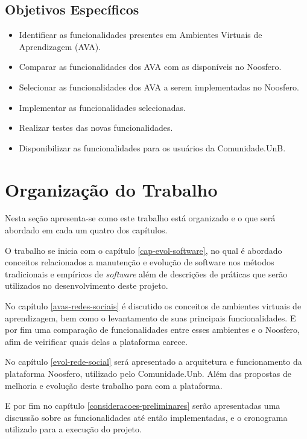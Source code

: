 \subsection{Objetivos Específicos}

\begin{itemize}
\item Identificar as funcionalidades presentes em Ambientes Virtuais de Aprendizagem (AVA).
\item Comparar as funcionalidades dos AVA com as disponíveis no Noosfero.
\item Selecionar as funcionalidades dos AVA a serem implementadas no Noosfero.
\item Implementar as funcionalidades selecionadas.
\item Realizar testes das novas funcionalidades.
\item Disponibilizar as funcionalidades para os usuários da Comunidade.UnB.
\end{itemize}

\section{Organização do Trabalho}

Nesta seção apresenta-se como este trabalho está organizado e o que será abordado em cada um quatro dos capítulos.

O trabalho se inicia com o capítulo \ref{cap-evol-software}, no qual é abordado conceitos relacionados a manutenção e evolução de software nos métodos tradicionais e empíricos de \textit{software} além de descrições de práticas que serão utilizados no desenvolvimento deste projeto.

No capítulo \ref{avas-redes-sociais} é discutido os conceitos de ambientes virtuais de aprendizagem, bem como o levantamento de suas principais funcionalidades. E por fim uma comparação de funcionalidades entre esses ambientes e o Noosfero, afim de veirificar quais delas a plataforma carece.

No capítulo \ref{evol-rede-social} será apresentado a arquitetura e funcionamento da plataforma Noosfero, utilizado pelo Comunidade.Unb. Além das propostas de melhoria e evolução deste trabalho para com a plataforma.

E por fim no capítulo \ref{consideracoes-preliminares} serão apresentadas uma discussão sobre as funcionalidades até então implementadas, e o cronograma utilizado para a execução do projeto.